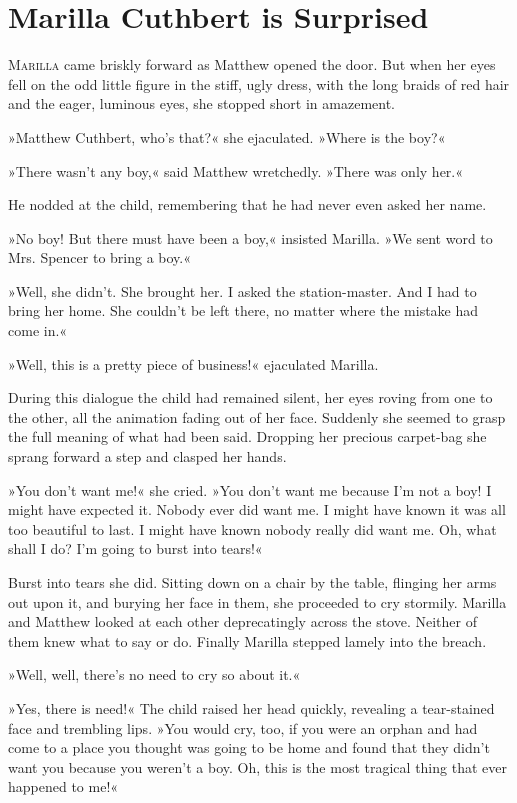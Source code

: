 \chapter{Marilla Cuthbert is Surprised}

\lettrine[lines=4]{M}{arilla} came briskly forward as Matthew opened the door. But when her eyes fell on the odd little figure in the stiff, ugly dress, with the long braids of red hair and the eager, luminous eyes, she stopped short in amazement.

»Matthew Cuthbert, who’s that?« she ejaculated. »Where is the boy?«

»There wasn’t any boy,« said Matthew wretchedly. »There was only her.«

He nodded at the child, remembering that he had never even asked her name.

»No boy! But there must have been a boy,« insisted Marilla. »We sent word to Mrs. Spencer to bring a boy.«

»Well, she didn’t. She brought her. I asked the station-master. And I had to bring her home. She couldn’t be left there, no matter where the mistake had come in.«

»Well, this is a pretty piece of business!« ejaculated Marilla.

During this dialogue the child had remained silent, her eyes roving from one to the other, all the animation fading out of her face. Suddenly she seemed to grasp the full meaning of what had been said. Dropping her precious carpet-bag she sprang forward a step and clasped her hands.

»You don’t want me!« she cried. »You don’t want me because I’m not a boy! I might have expected it. Nobody ever did want me. I might have known it was all too beautiful to last. I might have known nobody really did want me. Oh, what shall I do? I’m going to burst into tears!«

Burst into tears she did. Sitting down on a chair by the table, flinging her arms out upon it, and burying her face in them, she proceeded to cry stormily. Marilla and Matthew looked at each other deprecatingly across the stove. Neither of them knew what to say or do. Finally Marilla stepped lamely into the breach.

»Well, well, there’s no need to cry so about it.«

»Yes, there is need!« The child raised her head quickly, revealing a tear-stained face and trembling lips. »You would cry, too, if you were an orphan and had come to a place you thought was going to be home and found that they didn’t want you because you weren’t a boy. Oh, this is the most tragical thing that ever happened to me!«

